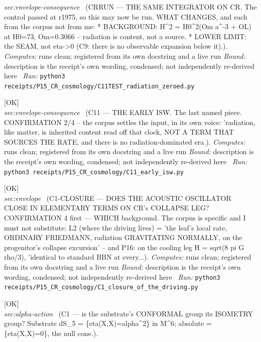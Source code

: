 \begin{description}
\textit{sec:envelope-consequence} \ (CRRUN --- THE SAME INTEGRATOR ON CR. The control passed at r1975, so this may now be run. WHAT CHANGES, and each from the corpus not from me: * BACKGROUND: H\textasciicircum{}2 = H0\textasciicircum{}2(Om a\textasciicircum{}-3 + OL) at H0=73, Om=0.3066 -- radiation is content, not a source. * LOWER LIMIT: the SEAM, not eta->0 (C9: there is no observable expansion below it).). 
\emph{Computes:} runs clean; registered from its own docstring and a live run
 \emph{Bound:} description is the receipt's own wording, condensed; not independently re-derived here
\ \emph{Run:} \texttt{python3 receipts/P15\_CR\_cosmology/C11TEST\_radiation\_zeroed.py}
\item[\label{rcpt:C11_early_isw}\texttt{C11\_early\_isw}]\hfill\textsf{[OK]}\\
\textit{sec:envelope-consequence} \ (C11 --- THE EARLY ISW. The last named piece. CONFIRMATION 2/4 -- the corpus settles the input, in its own voice: 'radiation, like matter, is inherited content read off that clock, NOT A TERM THAT SOURCES THE RATE, and there is no radiation-dominated era.). 
\emph{Computes:} runs clean; registered from its own docstring and a live run
 \emph{Bound:} description is the receipt's own wording, condensed; not independently re-derived here
\ \emph{Run:} \texttt{python3 receipts/P15\_CR\_cosmology/C11\_early\_isw.py}
\item[\label{rcpt:C1_closure_of_the_driving}\texttt{C1\_closure\_of\_the\_driving}]\hfill\textsf{[OK]}\\
\textit{sec:envelope} \ (C1-CLOSURE --- DOES THE ACOUSTIC OSCILLATOR CLOSE IN ELEMENTARY TERMS ON CR's COLLAPSE LEG? CONFIRMATION 4 first --- WHICH background. The corpus is specific and I must not substitute: L2 (where the driving lives) = 'the leaf's local rate, ORDINARY FRIEDMANN, radiation GRAVITATING NORMALLY, on the progenitor's collapse excursion' -- and P16: on the cooling leg \textbar{}H\textbar{} = sqrt(8 pi G rho/3), 'identical to standard BBN at every...). 
\emph{Computes:} runs clean; registered from its own docstring and a live run
 \emph{Bound:} description is the receipt's own wording, condensed; not independently re-derived here
\ \emph{Run:} \texttt{python3 receipts/P15\_CR\_cosmology/C1\_closure\_of\_the\_driving.py}
\item[\label{rcpt:C1_conformal_vs_isometric}\texttt{C1\_conformal\_vs\_isometric}]\hfill\textsf{[OK]}\\
\textit{sec:alpha-action} \ (C1 --- is the substrate's CONFORMAL group its ISOMETRY group? Substrate dS\_5 = \{eta(X,X)=alpha\textasciicircum{}2\} in M\textasciicircum{}6; absolute = \{eta(X,X)=0\}, the null cone.). 

\end{description}
